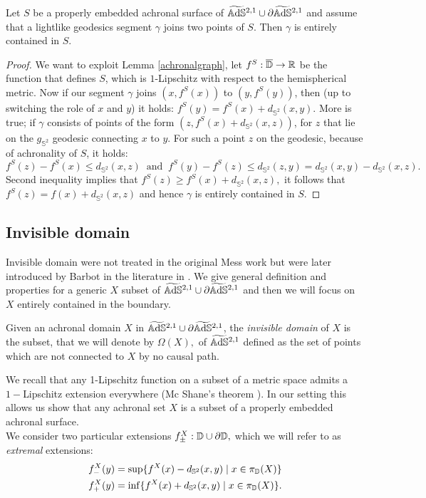 \begin{lemma}\label{containedgeo}
    Let $S$ be a properly embedded achronal surface of $\widetilde{\mathbb{A}\mathrm{d}\mathbb{S}}{}^{2,1}\cup\partial\widetilde{\mathbb{A}\mathrm{d}\mathbb{S}}{}^{2,1}$ and assume that a lightlike geodesics segment $\gamma$ joins two points of $S$. Then $\gamma$ is entirely contained in $S.$
\end{lemma}
\begin{proof}
    We want to exploit Lemma \ref{achronalgraph}, let $f^S:\overline{\mathbb{D}}\to\mathbb{R}$ be the function that defines $S$, which is $1$-Lipschitz with respect to the hemispherical metric. Now if our segment $\gamma$ joins $(x,f^S(x))$ to $(y,f^S(y))$, then (up to switching the role of $x$ and $y$) it holds: $f^S(y)=f^S(x)+d_{\mathbb{S}^2}(x,y).$ More is true; if $\gamma$ consists of points of the form $(z,f^S(x)+d_{\mathbb{S}^2}(x,z))$, for $z$ that lie on the $g_{\mathbb{S}^2}$ geodesic connecting $x$ to $y$. For such a point $z$ on the geodesic, because of achronality of $S$, it holds: 
        \[
            f^S(z)-f^S(x)\leq d_{\mathbb{S}^2}(x,z)\;\;\text{and}\;\;f^S(y)-f^S(z)\leq d_{\mathbb{S}^2}(z,y)=d_{\mathbb{S}^2}(x,y)-d_{\mathbb{S}^2}(x,z).
        \]
        Second inequality implies that $f^S(z)\geq f^S(x)+d_{\mathbb{S}^2}(x,z),$ it follows that $f^S(z)=f(x)+d_{\mathbb{S}^2}(x,z)$ and hence $\gamma$ is entirely contained in $S.$
\end{proof}

\subsection{Invisible domain}
Invisible domain were not treated in the original Mess work but were later introduced by Barbot in the literature in \cite{barbot2008causal}. We give general definition and properties for a generic $X$ subset of $\widetilde{\mathbb{A}\mathrm{d}\mathbb{S}}{}^{2,1}\cup\partial  \widetilde{\mathbb{A}\mathrm{d}\mathbb{S}}{}^{2,1}$ and then we will focus on $X$ entirely contained in the boundary. 

\begin{definition}
    Given an achronal domain $X$ in $\widetilde{\mathbb{A}\mathrm{d}\mathbb{S}}{}^{2,1}\cup\partial\widetilde{\mathbb{A}\mathrm{d}\mathbb{S}}{}^{2,1}$, the \textit{invisible domain} of $X$ is the subset, that we will denote by $\Omega(X),$ of $\widetilde{\mathbb{A}\mathrm{d}\mathbb{S}}{}^{2,1}$ defined as the set of points which are not connected to $X$ by no causal path.   
\end{definition}

We recall that any 1-Lipschitz function on a subset of a metric space admits a $1-$Lipschitz extension everywhere (Mc Shane's theorem \cite{mcshane1934extension}). In our setting this allows us show that any achronal set $X$ is a subset of a properly embedded achronal surface.\\
We consider two particular extensions $f_\pm^X:\mathbb{D}\cup\partial\mathbb{D},$ which we will refer to as \textit{extremal} extensions:
\begin{align*}
    f_-^X(y)&=\sup\{f^X(x)-d_{\mathbb{S}^2}(x,y)\;|\;x\in\pi_{\mathbb{D}}(X)\}    \\
    f_+^X(y)&=\inf\{f^X(x)+d_{\mathbb{S}^2}(x,y)\;|\;x\in\pi_{\mathbb{D}}(X)\}.
\end{align*}
    
